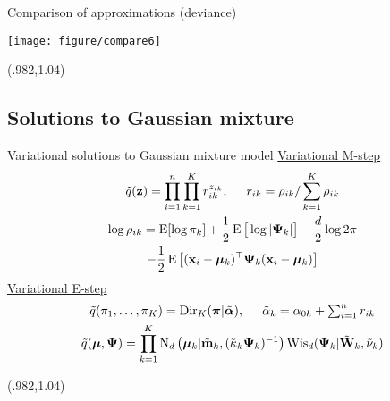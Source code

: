 \begin{frame}{Comparison of approximations (deviance)}
  \vspace{-5pt}
  \begin{center}
    \texttt{[image: figure/compare6]}
  \end{center}

  \begin{textblock*}{3cm}(.982\textwidth,1.04\textheight)%
    \hyperlink{quality}{}      
  \end{textblock*}  
\end{frame}

\subsection{Solutions to Gaussian mixture}

\begin{frame}[label=vigmmsoln]{Variational solutions to Gaussian mixture model}
  \underline{Variational M-step}
  \begin{align*}
  \begin{gathered}
    \tilde q(\bz) = \prod_{i=1}^n\prod_{k=1}^K r_{ik}^{z_{ik}}, \hspace{0.5cm} r_{ik} = \rho_{ik} / \sum_{k=1}^K \rho_{ik} \\
    \log \rho_{ik} = \E[\log\pi_k] + \half \E\big[\log|\bPsi_k|\big] - \half[d]\log 2\pi \\
    - \half \E \left[(\bx_i - \bmu_k)^\top \bPsi_k (\bx_i - \bmu_k)  \right]
  \end{gathered} 
  \end{align*}
  \underline{Variational E-step}
  \begin{align*}
  \begin{gathered}
    \tilde q(\pi_1,\dots,\pi_K) = \Dir_K(\bpi | \tilde\balpha),  \hspace{0.5cm}  \tilde\alpha_k = \alpha_{0k} + \textstyle\sum_{i=1}^n r_{ik} \\
    \tilde q(\bmu,\bPsi) = \prod_{k=1}^K \N_d\big(\bmu_k|\tilde\bmm_k, (\tilde\kappa_{k}\bPsi_k)^{-1}\big)\Wis_d(\bPsi_k|\tilde\bW_k,\tilde\nu_k)
  \end{gathered} 
  \end{align*}
  
  \begin{textblock*}{3cm}(.982\textwidth,1.04\textheight)%
    \hyperlink{vigmm}{}      
  \end{textblock*} 
\end{frame}

